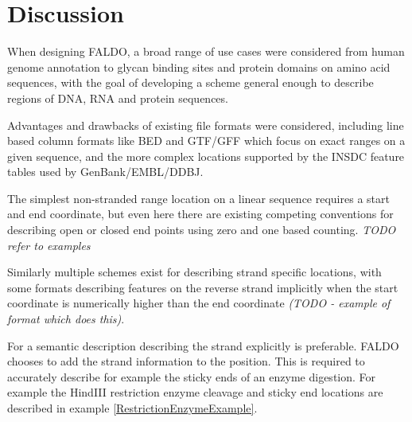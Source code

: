 \section*{Discussion}
When designing FALDO, a broad range of use cases were considered from
human genome annotation to glycan binding sites and protein domains on
amino acid sequences, with the goal of developing a scheme general enough
to describe regions of DNA, RNA and protein sequences.

Advantages and drawbacks of existing file formats were considered, including
line based column formats like BED and GTF/GFF which focus on exact
ranges on a given sequence, and the more complex locations supported
by the INSDC feature tables used by GenBank/EMBL/DDBJ.

The simplest non-stranded range location on a linear sequence requires
a start and end coordinate, but even here there are existing competing
conventions for describing open or closed end points using zero and
one based counting. \textit{TODO refer to examples}

Similarly multiple schemes exist for describing strand specific locations,
with some formats describing features on the reverse strand implicitly
when the start coordinate is numerically higher than the end coordinate
\textit{(TODO - example of format which does this)}.

For a semantic description describing the strand explicitly is preferable.
FALDO chooses to add the strand information to the position. 
This is required to accurately describe for example the sticky ends of an enzyme digestion.
For example the HindIII restriction enzyme cleavage and sticky end locations are described in example \ref{RestrictionEnzymeExample}.

